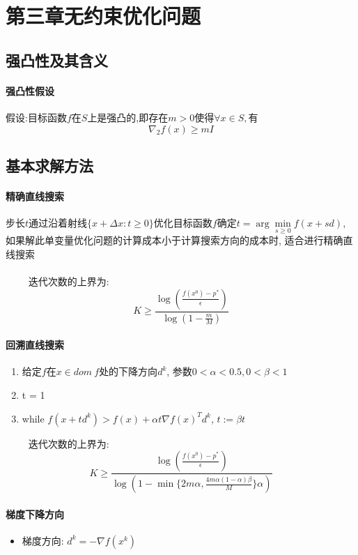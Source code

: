 \documentclass[UTF8]{article}
\begin{document}
\section{第三章\quad 无约束优化问题}

\subsection{强凸性及其含义	}
	\paragraph{强凸性假设} 假设:目标函数$f$在$S$上是强凸的,即存在$m > 0$使得$\forall x\in S,有$ \[ \nabla_2f(x)\geq mI\]
\subsection{基本求解方法}
	
		\paragraph{精确直线搜索}
		步长$t$通过沿着射线$\{x+\Delta x:t\geq 0\}$优化目标函数$f$确定$t=\arg\min\limits_{s\geq 0}f(x+sd)$, 如果解此单变量优化问题的计算成本小于计算搜索方向的成本时, 适合进行精确直线搜索\\
	\\$ \quad \quad$ 迭代次数的上界为:
		\begin{displaymath}
		K \geq \frac{\log( \frac{f(x^0)-p^*}{\epsilon})}{\log(1-\frac{m}{M})} 
		\end{displaymath}
		
		\paragraph{回溯直线搜索}
		\begin{enumerate}
	\item 给定$f$在$x\in dom\ f$处的下降方向$d^k$, 参数$0<\alpha <0.5, 0<\beta <1$
	\item t = 1
	\item while $f(x+td^k)>f(x)+\alpha t \nabla f(x)^T d^k$, $t:=\beta t$
\end{enumerate}
$\quad \quad$ 迭代次数的上界为:
\begin{displaymath}
		K \geq \frac{\log( \frac{f(x^0)-p^*}{\epsilon})}{\log(1-\min\{2m\alpha,\frac{4m\alpha(1-\alpha)\beta}{M}\}\alpha)} 
		\end{displaymath}

		 
		\paragraph{梯度下降方向}
		\begin{itemize}
		\item 梯度方向: $d^k = - \nabla f(x^k)$
		\end{itemize}
\end{document}
